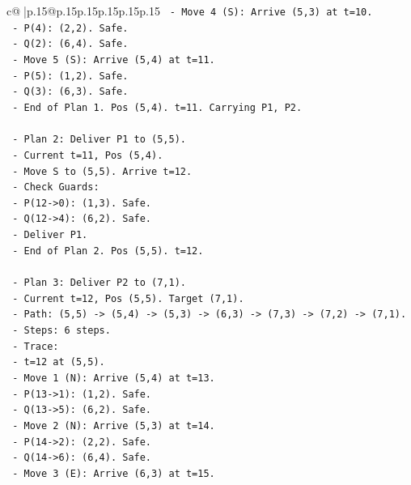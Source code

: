 \documentclass{article}
\begin{document}
{\begin{supertabular}{c@{$\;$}|p{.15\linewidth}@{}p{.15\linewidth}p{.15\linewidth}p{.15\linewidth}p{.15\linewidth}p{.15\linewidth}}
{{{\texttt{       {-} Move 4 (S): Arrive (5,3) at t=10.} \\
\texttt{         {-} P(4): (2,2). Safe.} \\
\texttt{         {-} Q(2): (6,4). Safe.} \\
\texttt{       {-} Move 5 (S): Arrive (5,4) at t=11.} \\
\texttt{         {-} P(5): (1,2). Safe.} \\
\texttt{         {-} Q(3): (6,3). Safe.} \\
\texttt{       {-} End of Plan 1. Pos (5,4). t=11. Carrying P1, P2.} \\
\\ 
\texttt{   {-} Plan 2: Deliver P1 to (5,5).} \\
\texttt{     {-} Current t=11, Pos (5,4).} \\
\texttt{     {-} Move S to (5,5). Arrive t=12.} \\
\texttt{     {-} Check Guards:} \\
\texttt{       {-} P(12{-}>0): (1,3). Safe.} \\
\texttt{       {-} Q(12{-}>4): (6,2). Safe.} \\
\texttt{     {-} Deliver P1.} \\
\texttt{     {-} End of Plan 2. Pos (5,5). t=12.} \\
\\ 
\texttt{   {-} Plan 3: Deliver P2 to (7,1).} \\
\texttt{     {-} Current t=12, Pos (5,5). Target (7,1).} \\
\texttt{     {-} Path: (5,5) {-}> (5,4) {-}> (5,3) {-}> (6,3) {-}> (7,3) {-}> (7,2) {-}> (7,1).} \\
\texttt{     {-} Steps: 6 steps.} \\
\texttt{     {-} Trace:} \\
\texttt{       {-} t=12 at (5,5).} \\
\texttt{       {-} Move 1 (N): Arrive (5,4) at t=13.} \\
\texttt{         {-} P(13{-}>1): (1,2). Safe.} \\
\texttt{         {-} Q(13{-}>5): (6,2). Safe.} \\
\texttt{       {-} Move 2 (N): Arrive (5,3) at t=14.} \\
\texttt{         {-} P(14{-}>2): (2,2). Safe.} \\
\texttt{         {-} Q(14{-}>6): (6,4). Safe.} \\
\texttt{       {-} Move 3 (E): Arrive (6,3) at t=15.} \\
}}}
\end{supertabular}}
\end{document}
